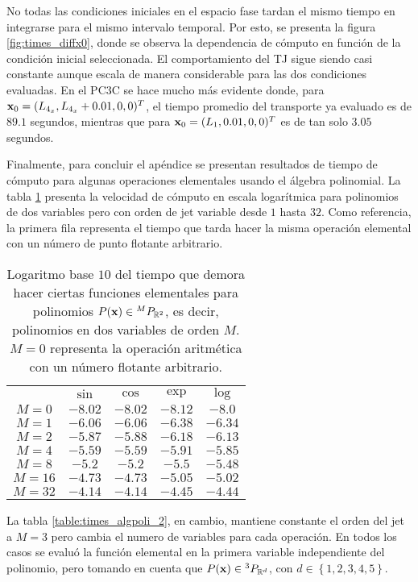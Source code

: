 No todas las condiciones iniciales en el espacio fase tardan el mismo tiempo en integrarse para el mismo intervalo temporal. Por esto, se presenta la figura \ref{fig:times_diffx0}, donde se observa la dependencia de cómputo en función de la condición inicial seleccionada. El comportamiento del TJ sigue siendo casi constante aunque escala de manera considerable para las dos condiciones evaluadas. En el PC3C se hace mucho más evidente donde, para $\mathbf{x}_0 = (L_{4_x}, L_{4_x} + 0.01, 0, 0)^T$, el tiempo promedio del transporte ya evaluado es de $89.1$ segundos, mientras que para $\mathbf{x}_0 = (L_1, 0.01, 0, 0)^T$ es de tan solo $3.05$ segundos.

Finalmente, para concluir el apéndice se presentan resultados de tiempo de cómputo para algunas operaciones elementales usando el álgebra polinomial. La tabla \ref{table:times_algpoli_1} presenta la velocidad de cómputo en escala logarítmica para polinomios de dos variables pero con orden de jet variable desde $1$ hasta $32$. Como referencia, la primera fila representa el tiempo que tarda hacer la misma operación elemental con un número de punto flotante arbitrario. 

\begin{table}[h!]
\centering
\begin{tabular}{c|cccc}
\toprule
     & \textbf{$\sin$} & \textbf{$\cos$} & \textbf{$\exp$} & \textbf{$\log$} \\ \cmidrule(l){1-5} 
$M=0$  & $-8.02$ & $-8.02$ & $-8.12$ & $-8.0 $ \\
$M=1$  & $-6.06$ & $-6.06$ & $-6.38$ & $-6.34$ \\
$M=2$  & $-5.87$ & $-5.88$ & $-6.18$ & $-6.13$ \\
$M=4$  & $-5.59$ & $-5.59$ & $-5.91$ & $-5.85$ \\
$M=8$  & $-5.2 $ & $-5.2 $ & $-5.5 $ & $-5.48$ \\
$M=16$ & $-4.73$ & $-4.73$ & $-5.05$ & $-5.02$ \\
$M=32$ & $-4.14$ & $-4.14$ & $-4.45$ & $-4.44$ \\ \bottomrule 
\end{tabular}
\caption{Logaritmo base $10$ del tiempo que demora hacer ciertas funciones elementales para polinomios $P(\mathbf{x}) \in {^{M}P_{\mathbb{R}^ 2} }$, es decir, polinomios en dos variables de orden $M$. $M=0$ representa la operación aritmética con un número flotante arbitrario.}
\label{table:times_algpoli_1}
\end{table}

La tabla \ref{table:times_algpoli_2}, en cambio, mantiene constante el orden del jet a $M=3$ pero cambia el numero de variables para cada operación. En todos los casos se evaluó la función elemental en la primera variable independiente del polinomio, pero tomando en cuenta que $P(\mathbf{x}) \in {^{3}P_{\mathbb{R}^ d} }$, con $d \in \left\lbrace 1,2,3,4,5 \right\rbrace$. 

